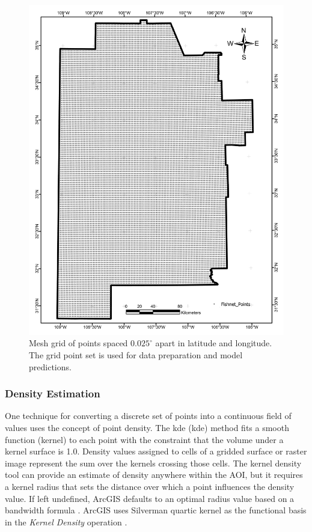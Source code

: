 \begin{figure}
\centering
\includegraphics[width=0.75\linewidth]{templates/images/Figure-Fishnet.pdf}
\caption[Mesh grid point set]{Mesh grid of points spaced $0.025^\circ$ apart in latitude and longitude. The grid point set is used for data preparation and model predictions.} 
\label{fig:meshgrid}
\end{figure}

\subsubsection{Density Estimation}\label{ch3:density_est}

One technique for converting a discrete set of points into a continuous field of values uses the concept of point density. The \acrlong{kde} (\acrshort{kde}) method fits a smooth function (kernel) to each point with the constraint that the volume under a kernel surface is 1.0. Density values assigned to cells of a gridded surface or raster image represent the sum over the kernels crossing those cells. The kernel density tool can provide an estimate of density anywhere within the AOI, but it requires a kernel radius that sets the distance over which a point influences the density value. If left undefined, ArcGIS defaults to an optimal radius value based on a bandwidth formula \citep{esri_kernel_2021}. ArcGIS uses Silverman quartic kernel as the functional basis in the \textit{Kernel Density} operation \citep{esri_kernel_2021,silverman_density_1986}.


